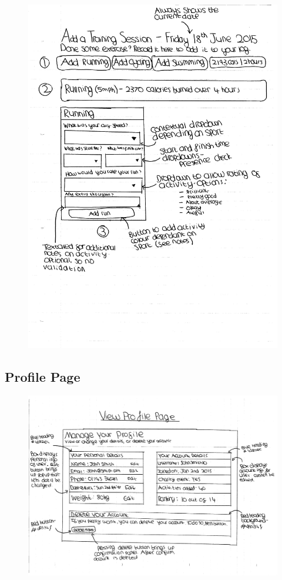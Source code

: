 \documentclass{article}[12pt,a4paper]
\begin{document}
\begin{figure}[h!]
  \includegraphics[scale=0.55]{design_ui/add_training}
\end{figure}
\clearpage

\subsection{Profile Page}
\begin{figure}[h!]
  \includegraphics[scale=0.55]{design_ui/profile}
\end{figure}
\clearpage
\end{document}
